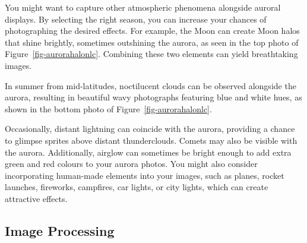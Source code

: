 \documentclass{article}
\newcommand{\contributed}[1]{%
    \par\noindent
    \begingroup
    \setlength{\leftskip}{1em}%
    \itshape
    Contributors: #1
    \par
    \endgroup
    \vspace{0.5em}
}
\begin{document}
You might want to capture other atmospheric phenomena alongside auroral displays. By selecting the right season, you can increase your chances of photographing the desired effects. For example, the Moon can create Moon halos that shine brightly, sometimes outshining the aurora, as seen in the top photo of Figure~\ref{fig-aurorahalonlc}. Combining these two elements can yield breathtaking images.

In summer from mid-latitudes, noctilucent clouds can be observed alongside the aurora, resulting in beautiful wavy photographs featuring blue and white hues, as shown in the bottom photo of Figure~\ref{fig-aurorahalonlc}.

Occasionally, distant lightning can coincide with the aurora, providing a chance to glimpse sprites above distant thunderclouds. Comets may also be visible with the aurora. Additionally, airglow can sometimes be bright enough to add extra green and red colours to your aurora photos. You might also consider incorporating human-made elements into your images, such as planes, rocket launches, fireworks, campfires, car lights, or city lights, which can create attractive effects.




\subsection{Image Processing}
\end{document}
